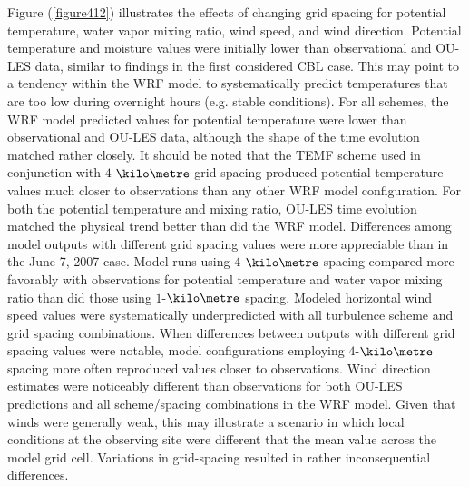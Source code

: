 Figure (\autoref{figure412}) illustrates the effects of changing grid spacing for potential temperature, water vapor mixing ratio, wind speed, and wind direction. Potential temperature and moisture values were initially lower than observational and OU-LES data, similar to findings in the first considered CBL case. This may point to a tendency within the WRF model to systematically predict temperatures that are too low during overnight hours (e.g. stable conditions). For all schemes, the WRF model predicted values for potential temperature were lower than observational and OU-LES data, although the shape of the time evolution matched rather closely. It should be noted that the TEMF scheme used in conjunction with $4$-$\kilo\metre$ grid spacing produced potential temperature values much closer to observations than any other WRF model configuration. For both the potential temperature and mixing ratio, OU-LES time evolution matched the physical trend better than did the WRF model. Differences among model outputs with different grid spacing values were more appreciable than in the June 7, 2007 case. Model runs using $4$-$\kilo\metre$ spacing compared more favorably with observations for potential temperature and water vapor mixing ratio than did those using $1$-$\kilo\metre$ spacing. Modeled horizontal wind speed values were systematically underpredicted with all turbulence scheme and grid spacing combinations. When differences between outputs with different grid spacing values were notable, model configurations employing $4$-$\kilo\metre$ spacing more often reproduced values closer to observations. Wind direction estimates were noticeably different than observations for both OU-LES predictions and all scheme\slash spacing combinations in the WRF model. Given that winds were generally weak, this may illustrate a scenario in which local conditions at the observing site were different that the mean value across the model grid cell. Variations in grid-spacing resulted in rather inconsequential differences.


